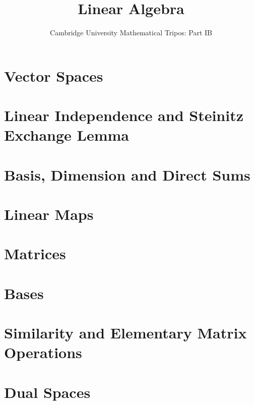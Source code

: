 \documentclass{article}
\title{Linear Algebra}
\author{Cambridge University Mathematical Tripos: Part IB}
\begin{document}
\maketitle

\tableofcontentsnewpage{}

\section{Vector Spaces}

\section{Linear Independence and Steinitz Exchange Lemma}

\section{Basis, Dimension and Direct Sums}

\section{Linear Maps}

\section{Matrices}

\section{Bases}

\section{Similarity and Elementary Matrix Operations}

\section{Dual Spaces}

\end{document}
